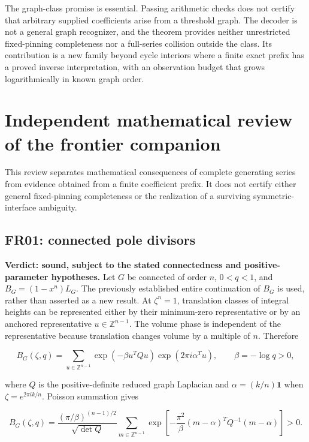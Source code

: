 \documentclass[
  11pt,
  a4paper,
]{report}
\begin{document}
The graph-class promise is essential. Passing arithmetic checks does not
certify that arbitrary supplied coefficients arise from a threshold
graph. The decoder is not a general graph recognizer, and the theorem
provides neither unrestricted fixed-pinning completeness nor a
full-series collision outside the class. Its contribution is a new
family beyond cycle interiors where a finite exact prefix has a proved
inverse interpretation, with an observation budget that grows
logarithmically in known graph order.

\hypertarget{independent-mathematical-review-of-the-frontier-companion}{%
\chapter{Independent mathematical review of the frontier
companion}\label{independent-mathematical-review-of-the-frontier-companion}}

This review separates mathematical consequences of complete generating
series from evidence obtained from a finite coefficient prefix. It does
not certify either general fixed-pinning completeness or the realization
of a surviving symmetric-interface ambiguity.

\hypertarget{fr01-connected-pole-divisors}{%
\section{FR01: connected pole
divisors}\label{fr01-connected-pole-divisors}}

\textbf{Verdict: sound, subject to the stated connectedness and
positive-parameter hypotheses.} Let \(G\) be connected of order \(n\),
\(0<q<1\), and \(B_G=(1-x^n)L_G\). The previously established entire
continuation of \(B_G\) is used, rather than asserted as a new result.
At \(\zeta^n=1\), translation classes of integral heights can be
represented either by their minimum-zero representative or by an
anchored representative \(u\in\mathbb Z^{n-1}\). The volume phase is
independent of the representative because translation changes volume by
a multiple of \(n\). Therefore

\[
 B_G(\zeta,q)=\sum_{u\in\mathbb Z^{n-1}}
 \exp(-\beta u^TQ u)\exp(2\pi i\alpha^Tu),\qquad \beta=-\log q>0,
\]

where \(Q\) is the positive-definite reduced graph Laplacian and
\(\alpha=(k/n)\mathbf1\) when \(\zeta=e^{2\pi i k/n}\). Poisson
summation gives

\[
 B_G(\zeta,q)=\frac{(\pi/\beta)^{(n-1)/2}}{\sqrt{\det Q}}
 \sum_{m\in\mathbb Z^{n-1}}
 \exp\!\left[-\frac{\pi^2}{\beta}(m-\alpha)^TQ^{-1}(m-\alpha)\right]>0.
\]
\end{document}
